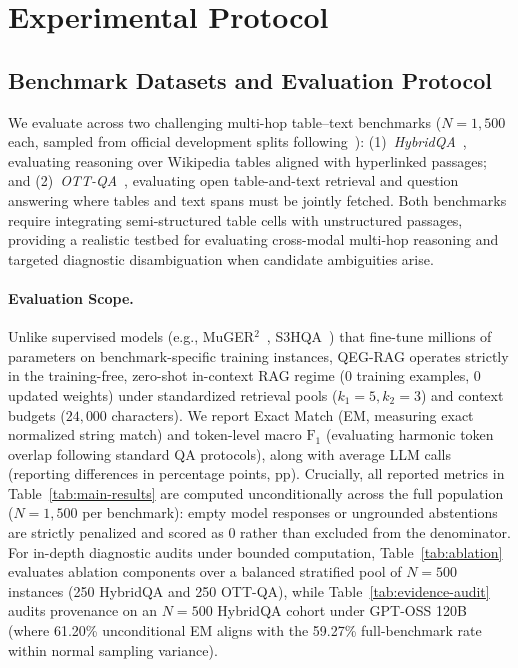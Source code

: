 \documentclass[runningheads]{llncs}
\begin{document}
\section{Experimental Protocol}
\label{sec:experiments}

\subsection{Benchmark Datasets and Evaluation Protocol}
We evaluate across two challenging multi-hop table--text benchmarks ($N=1{,}500$ each, sampled from official development splits following~\cite{agarwal2025hybrid}): (1)~\emph{HybridQA}~\cite{hybridqa}, evaluating reasoning over Wikipedia tables aligned with hyperlinked passages; and (2)~\emph{OTT-QA}~\cite{chen2021ottqa}, evaluating open table-and-text retrieval and question answering where tables and text spans must be jointly fetched. Both benchmarks require integrating semi-structured table cells with unstructured passages, providing a realistic testbed for evaluating cross-modal multi-hop reasoning and targeted diagnostic disambiguation when candidate ambiguities arise.

\paragraph{Evaluation Scope.}
Unlike supervised models (e.g., MuGER$^2$~\cite{wang2022muger2}, S3HQA~\cite{lei2023s3hqa}) that fine-tune millions of parameters on benchmark-specific training instances, QEG-RAG operates strictly in the training-free, zero-shot in-context RAG regime (0 training examples, 0 updated weights) under standardized retrieval pools ($k_1=5, k_2=3$) and context budgets ($24{,}000$ characters). We report Exact Match (EM, measuring exact normalized string match) and token-level macro $\text{F}_1$ (evaluating harmonic token overlap following standard QA protocols), along with average LLM calls (reporting differences in percentage points, pp). Crucially, all reported metrics in Table~\ref{tab:main-results} are computed unconditionally across the full population ($N=1{,}500$ per benchmark): empty model responses or ungrounded abstentions are strictly penalized and scored as 0 rather than excluded from the denominator. For in-depth diagnostic audits under bounded computation, Table~\ref{tab:ablation} evaluates ablation components over a balanced stratified pool of $N=500$ instances (250 HybridQA and 250 OTT-QA), while Table~\ref{tab:evidence-audit} audits provenance on an $N=500$ HybridQA cohort under GPT-OSS 120B (where 61.20\% unconditional EM aligns with the 59.27\% full-benchmark rate within normal sampling variance).
\end{document}
